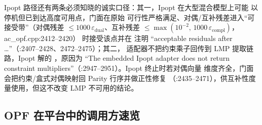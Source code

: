 Ipopt 路径还有两条必须知晓的诚实口径：其一，Ipopt 在大型混合模型上可能
以  停机但已到达高度可用点，门面在原始
可行性严格满足、对偶/互补残差进入“可接受带”（对偶残差
$\le 1000\,\varepsilon_{\mathrm{dual}}$、互补残差
$\le \max(10^{-2},\,1000\,\varepsilon_{\mathrm{compl}})$，ac\_opf.cpp:2412--2420）
时接受该点并在  注明
``acceptable residuals after \ldots''（:2407--2428、2472--2475）；其二，
适配器不把约束乘子回传到 LMP 提取链路，Ipopt 解的
，原因为 ``The embedded Ipopt adapter does not
return constraint multipliers''（:2947--2951）。Ipopt 终止时若对偶向量
维度齐全，门面会把约束/盒式对偶映射回 Parity 行序并做正性修复
（:2435--2471），供互补性度量使用，但这不改变 LMP 不可用的结论。

\subsection{OPF 在平台中的调用方速览}\label{subsec:overview-callers}

